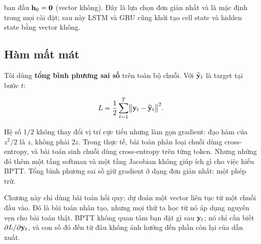  ban đầu $\mathbf{h}_0 = \mathbf{0}$ (vector
không). Đây là lựa chọn
đơn giản nhất và là mặc định trong mọi cài đặt; sau này LSTM và GRU cũng khởi
tạo cell state và hidden state bằng vector không.

\subsection{Hàm mất mát}

Tôi dùng \textbf{tổng bình phương sai số} trên toàn bộ chuỗi. Với
$\widehat{\mathbf{y}}_t$ là target tại bước $t$:

\begin{equation}
  L = \frac{1}{2} \sum_{t=1}^{T} \bigl\|
      \mathbf{y}_t - \widehat{\mathbf{y}}_t
      \bigr\|^2.
  \label{eq:rnn-loss}
\end{equation}

Hệ số $1/2$ không thay đổi vị trí cực tiểu nhưng làm gọn gradient: đạo hàm
của $z^2/2$ là $z$, không phải $2z$. Trong thực tế, bài toán phân loại chuỗi
dùng cross-entropy, và bài toán sinh chuỗi dùng cross-entropy trên từng
token. Nhưng những  đó thêm một tầng softmax và
một tầng Jacobian
không giúp ích gì cho việc hiểu BPTT. Tổng bình phương sai số giữ gradient
ở dạng đơn giản nhất: một phép trừ.

Chương này chỉ dùng bài toán hồi quy; dự đoán một vector liên tục từ một
chuỗi đầu vào. Đó là bài toán nhân tạo, nhưng mọi thứ ta học từ nó áp dụng
nguyên vẹn cho bài toán thật. BPTT không quan tâm bạn đặt gì sau
$\mathbf{y}_t$; nó chỉ cần biết $\partial L / \partial \mathbf{y}_t$, và con số
đó đến từ đâu không ảnh hưởng đến phần còn lại của dẫn xuất.
